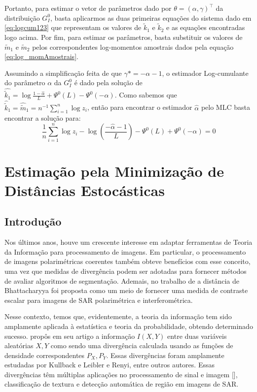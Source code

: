 \documentclass[12pt]{article}
\begin{document}
Portanto, para estimar o vetor de parâmetros dado por $\theta = (\alpha, \gamma)^{\top}$ da distribuição $G_I^0$, basta aplicarmos as duas primeiras equações do sistema dado em \eqref{eq:logcum123} que representam os valores de $\tilde{k}_{1}$ e $\tilde{k}_{2}$ e as equações encontradas logo acima. Por fim, para estimar os parâmetros, basta substituir os valores de $\tilde{m}_{1}$ e $\tilde{m}_{2}$ pelos correspondentes log-momentos amostrais dados pela equação \eqref{eq:log_momAmostrais}. 

Assumindo a simplificação feita de que $\gamma* = -\alpha - 1$, o estimador Log-cumulante do parâmetro $\alpha$ da $G_I^0$ é dado pela solução de $\hat{\tilde{k}_{1}} = \log \frac{1-\hat{\alpha}}{L} + \Psi^{0}(L) - \Psi^{0}(-\alpha)$. Como sabemos que $\hat{\tilde{k}}_{1} = \hat{\tilde{m}}_{1} = n^{-1}\sum_{i=1}^{n}\log z_i$, então para encontrar o estimador $\hat{\alpha}$ pelo MLC basta encontrar a solução para:
\begin{equation}
    \frac{1}{n}\sum_{i=1}^{n}\log z_i - \log \left ( \frac{-\hat{\alpha}-1}{L} \right ) - \Psi^{0}(L) + \Psi^{0}(-\alpha) = 0
    \label{eq:alphaEst_logCum}
\end{equation}

\section{Estimação pela Minimização de Distâncias Estocásticas}

\subsection{Introdução}

Nos últimos anos, houve um crescente interesse em adaptar ferramentas de Teoria da Informação para processamento de imagens. Em particular, o processamento de imagens polarimétricas coerentes também obteve benefícios com esse conceito, uma vez que medidas de divergência podem ser adotadas para fornecer métodos de avaliar algoritmos de segmentação. Ademais, no trabalho de \citet{Goudail:04} a distância de Bhattacharyya foi proposta como um meio de fornecer uma medida de contraste escalar para imagens de SAR polarimétrica e interferométrica.

Nesse contexto, temos que, evidentemente, a teoria da informação tem sido amplamente aplicada à estatística e teoria da probabilidade, obtendo determinado sucesso. \citet{Shannon48} propôs em seu artigo a informação $I(X,Y)$ entre duas variáveis aleatórias $X, Y$ como sendo uma divergência calculada usando as funções de densidade correspondentes $P_{X}, P_{Y}$. Essas divergências foram amplamente estudadas por Kullback e Leibler e Renyi, entre outros autores. Essas divergências têm múltiplas aplicações no processamento de sinal e imagem [\citet{Aviyente}], classificação de textura e detecção automática de região em imagens de SAR.
\end{document}
